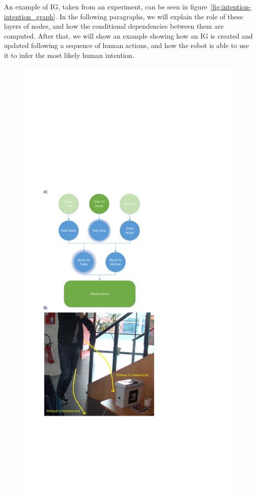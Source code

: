 An example of IG, taken from an experiment, can be seen in figure~\ref{fig:intention-intention_graph}. In the following paragraphs, we will explain the role of these layers of nodes, and how the conditional dependencies between them are computed. After that, we will show an example showing how an IG is created and updated following a sequence of human actions, and how the robot is able to use it to infer the most likely human intention.

 \begin{figure}[ht!]
	\centering
	\includegraphics[trim={2cm 11cm 11cm 17cm},clip,scale=0.45]{img/observer/cookieScenario.pdf}

\end{figure}
